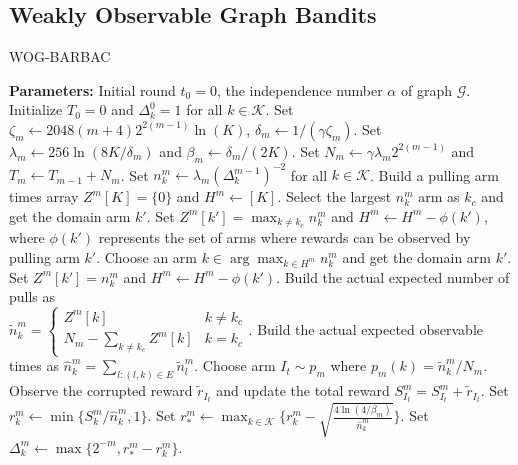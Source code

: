 \subsection{Weakly Observable Graph Bandits}
\label{sec:wog}

\begin{algorithm}[!ht]
    \caption{WOG-BARBAC}
    \label{algs:WOG-BARBAC} %
    \begin{algorithmic}[1]
        \STATE \textbf{Parameters:} Initial round $t_0=0$, the independence number $\alpha$ of graph $\mathcal{G}$.
        \STATE Initialize $T_0 = 0$ and $\Delta_k^0 = 1$ for all $k \in \mathcal{K}$.
            \STATE Set $\zeta_m \leftarrow 2048(m + 4)2^{2(m-1)}\ln (K)$, $\delta_m \leftarrow 1/(\gamma\zeta_m)$.
            \STATE Set $\lambda_m \leftarrow 256 \ln{\left(8K / \delta_m\right)}$ and $\beta_m \leftarrow \delta_m / (2K)$.
            \STATE Set $N_m \leftarrow \gamma \lambda_m 2^{2(m-1)}$
            and $T_m \leftarrow T_{m-1} + N_m$.
            \STATE Set $n_k^m \leftarrow \lambda_m (\Delta_k^{m-1})^{-2}$ for all $k \in \mathcal{K}$.
            \STATE Build a pulling arm times array $Z^m[K] = \{0\}$ and $H^m \leftarrow [K]$.
            \STATE Select the largest $n_k^m$ arm as $k_c$ and get the domain arm $k'$.
            \STATE Set $Z^m [k'] = \max_{k \neq k_c} n_k^m$ and $H^m \leftarrow H^m - \phi(k')$, where $\phi(k')$ represents the set of arms where rewards can be observed by pulling arm $k'$.
            \REPEAT
                \STATE Choose an arm $k \in \arg\max_{k \in H^m}n_k^m$ and get the domain arm $k'$.
                \STATE Set $Z^m[k'] = n_k^m$ and $H^m \leftarrow H^m - \phi(k')$.
            \STATE Build the actual expected number of pulls as \\
            $\widetilde{n}_k^m = \begin{cases}
                Z^m[k] & k \neq k_c \\
                N_m - \sum_{k \neq k_c} Z^m[k] & k = k_c
            \end{cases}$.
            \STATE Build the actual expected observable times as
            $\hat{n}_k^m = \sum_{l: (l, k) \in E} \widetilde{n}_l^m $.
                \STATE Choose arm $I_t\sim p_m$ where $p_m(k)= \widetilde{n}_k^m / N_m$.
                \STATE Observe the corrupted reward $\widetilde{r}_{I_t}$ and update the total reward
                $S_{I_t}^m = S_{I_t}^m + \widetilde{r}_{I_t}$.
            \ENDFOR 
            \STATE Set $r_k^m \leftarrow \min \{S_k^m / \hat{n}_k^m, 1\}$.
            \STATE Set $r_*^m \leftarrow \max_{k \in \mathcal{K}}\{r_k^m - \sqrt{\frac{4\ln(4 / \beta_m)}{\hat{n}_k^m}}\}$.
            \STATE Set $\Delta_k^m \leftarrow \max\{2^{-m}, r_*^m - r_k^m\}$.
        \ENDFOR
    \end{algorithmic}
\end{algorithm}

